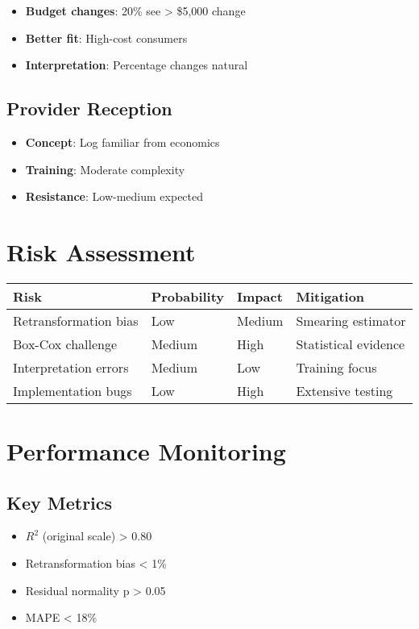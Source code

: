 \begin{itemize}
    \item \textbf{Budget changes}: 20\% see > \$5,000 change
    \item \textbf{Better fit}: High-cost consumers
    \item \textbf{Interpretation}: Percentage changes natural
\end{itemize}

\subsection{Provider Reception}

\begin{itemize}
    \item \textbf{Concept}: Log familiar from economics
    \item \textbf{Training}: Moderate complexity
    \item \textbf{Resistance}: Low-medium expected
\end{itemize}

\section{Risk Assessment}

\begin{center}
\begin{tabular}{llll}
\toprule
Risk & Probability & Impact & Mitigation \\
\midrule
Retransformation bias & Low & Medium & Smearing estimator \\
Box-Cox challenge & Medium & High & Statistical evidence \\
Interpretation errors & Medium & Low & Training focus \\
Implementation bugs & Low & High & Extensive testing \\
\bottomrule
\end{tabular}
\end{center}

\section{Performance Monitoring}

\subsection{Key Metrics}

\begin{itemize}
    \item $R^2$ (original scale) > 0.80
    \item Retransformation bias < 1\%
    \item Residual normality p > 0.05
    \item MAPE < 18\%
\end{itemize}

